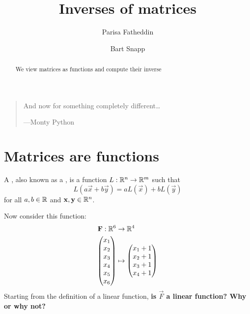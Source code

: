 \documentclass{ximera}
\author{Parisa Fatheddin \and Bart Snapp}
\title{Inverses of matrices}
\begin{document}
\begin{abstract}
  We view matrices as functions and compute their inverse
\end{abstract}
\maketitle



\begin{quote}
  And now for something completely different\dots


\hfill ---Monty Python
\end{quote}








\section{Matrices are functions}

\begin{definition}
  A , also known as a , is a function $L:\mathbb{R}^n\to\mathbb{R}^m$ such that
  \[
  L(a\vec{x}+b\vec{y}) = aL(\vec{x}) + bL(\vec{y})
  \]
  for all $a,b\in\mathbb{R}$ and $\mathbf{x},\mathbf{y}\in \mathbb{R}^n$.
\end{definition}

\begin{question}
  Now consider this function:
  \begin{align*}
    \mathbf{F}: \mathbb{R}^6 &\to \mathbb{R}^4\\
    \begin{pmatrix}
      x_1\\
      x_2\\
      x_3\\
      x_4\\
      x_5\\
      x_6
    \end{pmatrix}
    &\mapsto
        \begin{pmatrix}
      x_1+1\\
      x_2+1\\
      x_3+1\\
      x_4+1
    \end{pmatrix}
  \end{align*}
  Starting from the definition of a linear function, \textbf{is $\vec{F}$ a
  linear function? Why or why not?}
\end{question}
\end{document}
